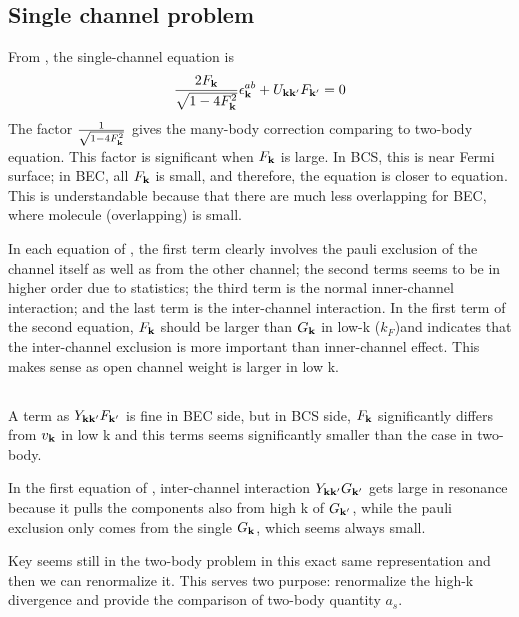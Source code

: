 \subsection{Single channel problem}
From , the single-channel equation is 
\begin{equation}
\frac{2F_{\mathbf{k}}}{\sqrt{1-4 F_{\mathbf{k}}^2}} \epsilon^{ab}_{\mathbf{k}}+U_{\mathbf{k}\mathbf{k}'}F_{\mathbf{k}'}=0
\end{equation}
The factor $\frac{1}{\sqrt{1-4 F_{\mathbf{k}}^2}}$ gives the many-body correction comparing to two-body \sch equation.  This factor is significant when $F_{\mathbf{k}}$ is large.  In BCS, this is near Fermi surface;  in BEC, all $F_{\mathbf{k}}$ is small, and therefore, the equation is closer to \sch  equation.  This is understandable because that there are much less overlapping for BEC, where molecule (overlapping) is small.  

In each equation of ,  the first term clearly involves the pauli exclusion of the channel itself as well as from the other channel;  the second terms seems to be in higher order due to statistics;  the third term is the normal inner-channel interaction; and the last term is the inter-channel interaction.  In the first term of the second equation,  $F_{\mathbf{k}}$ should be larger than $G_{\mathbf{k}}$ in low-k ($k_{F}$)and indicates that the inter-channel exclusion is more important than inner-channel effect.  This makes sense as open channel weight is larger in low k.  

\subsection{}
A term as $Y_{\mathbf{k}\mathbf{k}'}F_{\mathbf{k}'}$ is fine in BEC side, but in BCS side, $F_{\mathbf{k}}$ significantly differs from $v_{\mathbf{k}}$ in low k and this terms seems significantly smaller than the case in two-body. 

In the first equation of , inter-channel interaction $Y_{\mathbf{k}\mathbf{k}'}G_{\mathbf{k}'}$ gets large in resonance because it pulls the components also from high k of $G_{\mathbf{k}'}$, while the pauli exclusion only comes from the single $G_{\mathbf{k}}$, which seems always small.  

Key seems still in the two-body problem in this exact same representation and then we can renormalize it.  This serves two purpose: renormalize the high-k divergence and provide the comparison of two-body quantity $a_{s}$.

